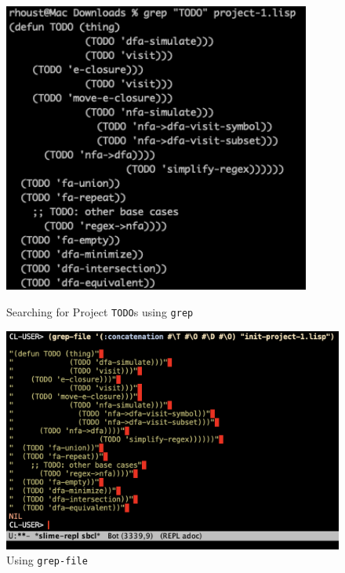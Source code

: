 \documentclass[12pt,letterpaper]{ntdhw}
\begin{document}
\begin{enumerate}
  \begin{figure}[h!]
    \centering
    \begin{minipage}{0.45\textwidth}
        \centering
        \includegraphics[width=0.9\textwidth]{images/grepScreenCap.png}
        \caption{Searching for Project \texttt{TODO}s using \texttt{grep}}
    \end{minipage}\hfill
    \begin{minipage}{0.55\textwidth}
        \centering
        \includegraphics[width=1.0\textwidth]{images/1_project.png}
        \caption{Using \texttt{grep-file}}
    \end{minipage}
  \end{figure}


\end{enumerate}
\end{document}

